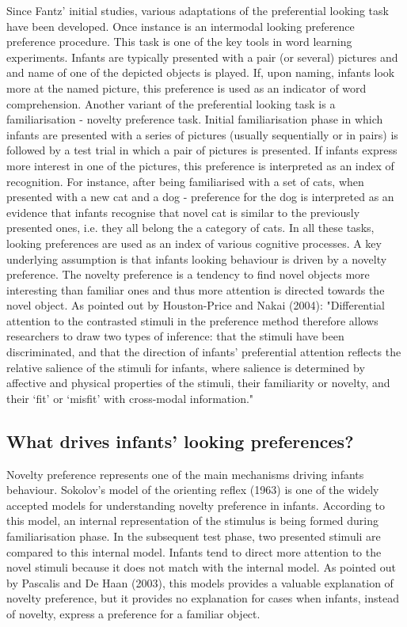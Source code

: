 \documentclass[a4paper,man,natbib]{apa6}
\begin{document}
Since Fantz' initial studies, various adaptations of the preferential looking task have been developed. Once instance is an intermodal looking preference preference procedure. This task is one of the key tools in word learning experiments. Infants are typically presented with a pair (or several) pictures and and name of one of the depicted objects is played. If, upon naming, infants look more at the named picture, this preference is used as an indicator of word comprehension. 
Another variant of the preferential looking task is a familiarisation - novelty preference task. Initial familiarisation phase in which infants are presented with a series of pictures (usually sequentially or in pairs) is followed by a test trial in which a pair of pictures is presented. If infants express more interest in one of the pictures, this preference is interpreted as an index of recognition. For instance, after being familiarised with a set of cats, when presented with a new cat and a dog - preference for the dog is interpreted as an evidence that infants recognise that novel cat is similar to the previously presented ones, i.e. they all belong the a category of cats.
In all these tasks, looking preferences are used as an index of various cognitive processes. A key underlying assumption is that infants looking behaviour is driven by a novelty preference. The novelty preference is a tendency to find novel objects more interesting than familiar ones and thus more attention is directed towards the novel object. As pointed out by Houston-Price and Nakai (2004): "Differential attention to the contrasted stimuli in the preference method therefore allows researchers to draw two types of inference: that the stimuli have been discriminated, and that the direction of infants’ preferential attention reflects the relative salience of the stimuli for infants, where salience is determined by affective and physical properties of the stimuli, their familiarity or novelty, and their ‘fit’ or ‘misfit’ with cross-modal information."

\subsection{What drives infants' looking preferences?}
Novelty preference represents one of the main mechanisms driving infants behaviour. Sokolov's model of the orienting reflex (1963) is one of the widely accepted models for understanding novelty preference in infants. According to this model, an internal representation of the stimulus is being formed during familiarisation phase. In the subsequent test phase, two presented stimuli are compared to this internal model. Infants tend to direct more attention to the novel stimuli because it does not match with the internal model. As pointed out by Pascalis and De Haan (2003), this models provides a valuable explanation of novelty preference, but it provides no explanation for cases when infants, instead of novelty, express a preference for a familiar object.
\end{document}
